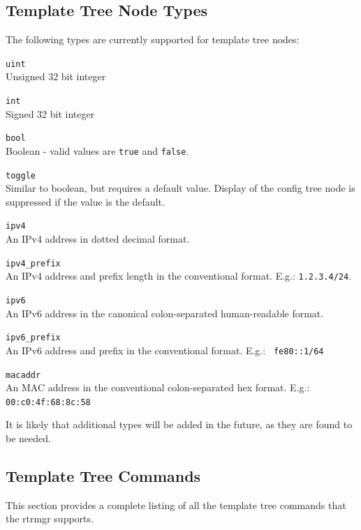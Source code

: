 \documentclass[11pt]{article}
\begin{document}
\subsection{Template Tree Node Types}
The following types are currently supported for template tree nodes:
\begin{description}
\item{\tt uint}\\
Unsigned 32 bit integer
\item{\tt int}\\
Signed 32 bit integer
\item{\tt bool}\\
Boolean - valid values are {\tt true} and {\tt false}.
\item{\tt toggle}\\
Similar to boolean, but requires a default value.  Display of the
config tree node is suppressed if the value is the default.
\item{\tt ipv4}\\
An IPv4 address in dotted decimal format.
\item{\tt ipv4\_prefix}\\ An IPv4 address and prefix length in the
conventional format.  E.g.: {\tt 1.2.3.4/24}.
\item{\tt ipv6}\\
An IPv6 address in the canonical colon-separated human-readable format.
\item{\tt ipv6\_prefix}\\
An IPv6 address and prefix in the conventional format. E.g.: {\tt
fe80::1/64}
\item{\tt macaddr}\\
An MAC address in the conventional colon-separated hex format.  E.g.:
{\tt 00:c0:4f:68:8c:58}
\end{description}
It is likely that additional types will be added in the future, as
they are found to be needed.

\subsection{Template Tree Commands}
This section provides a complete listing of all the template tree
commands that the rtrmgr supports.
\end{document}
